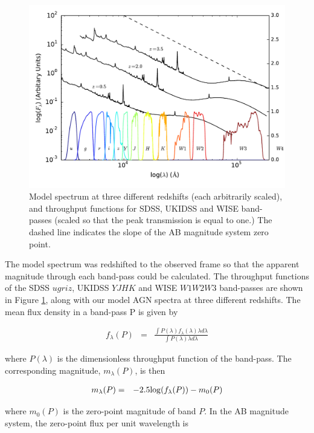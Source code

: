 \begin{figure}
  \centering
  \includegraphics[width=\textwidth]{figures/chapter06/throughputs}
  \caption{Model spectrum at three different redshifts (each arbitrarily scaled), and throughput functions for SDSS, UKIDSS and WISE band-passes (scaled so that the peak transmission is equal to one.) The dashed line indicates the slope of the AB magnitude system zero point.}
  \label{fig:filters}
\end{figure}

The model spectrum was redshifted to the observed frame so that the apparent magnitude through each band-pass could be calculated. The throughput functions of the SDSS $ugriz$, UKIDSS $YJHK$ and WISE $W1W2W3$ band-passes are shown in Figure \ref{fig:filters}, along with our model AGN spectra at three different redshifts. The mean flux density in a band-pass P is given by 

\begin{eqnarray}
  \label{eq:flux}
  f_{\lambda}(P) & = & \frac{\int P(\lambda) f_\lambda(\lambda) \lambda d\lambda }{\int P(\lambda) \lambda d\lambda}
\end{eqnarray}

where $P(\lambda)$ is the dimensionless throughput function of the band-pass. The corresponding magnitude, $m_\lambda(P)$, is then 

\begin{eqnarray}
  m_\lambda(P) & = & -2.5{\rm log}(f_\lambda(P)) - m_0(P)
\end{eqnarray}

where $m_0(P)$ is the zero-point magnitude of band $P$. In the AB magnitude system, the zero-point flux per unit wavelength is 

